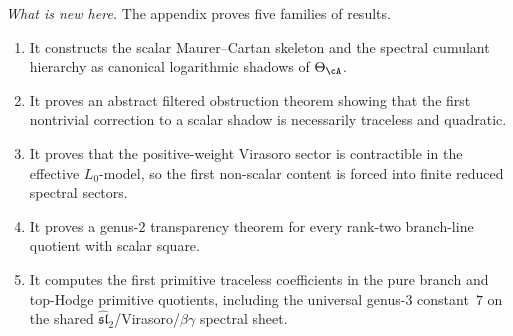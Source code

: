 \medskip
\noindent\emph{What is new here.}
The appendix proves five families of results.
\begin{enumerate}
\item It constructs the scalar Maurer--Cartan skeleton and the spectral
 cumulant hierarchy as canonical logarithmic shadows of
 \(\Theta_{\cA}\).
\item It proves an abstract filtered obstruction theorem showing that
 the first nontrivial correction to a scalar shadow is necessarily
 traceless and quadratic.
\item It proves that the positive-weight Virasoro sector is contractible
 in the effective \(L_0\)-model, so the first non-scalar content is
 forced into finite reduced spectral sectors.
\item It proves a genus-\(2\) transparency theorem for every rank-two
 branch-line quotient with scalar square.
\item It computes the first primitive traceless coefficients in the pure
 branch and top-Hodge primitive quotients, including the universal
 genus-\(3\) constant~\(7\) on the shared
 \(\widehat{\mathfrak{sl}}_2\)/Virasoro/\(\beta\gamma\) spectral
 sheet.
\end{enumerate}

